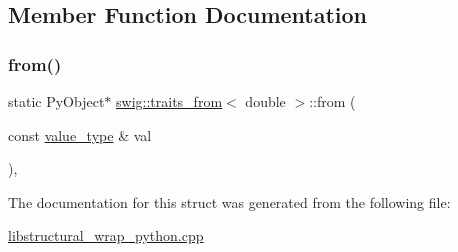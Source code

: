 \subsection{Member Function Documentation}
\mbox{\label{structswig_1_1traits__from_3_01double_01_4_ae561b4392eb983662f203737585c2241}} 
\subsubsection{\texorpdfstring{from()}{from()}}
{\footnotesize\ttfamily static Py\+Object$\ast$ \hyperlink{structswig_1_1traits__from}{swig\+::traits\+\_\+from}$<$ double $>$\+::from (\begin{DoxyParamCaption}\item[{const \hyperlink{structswig_1_1traits__from_3_01double_01_4_a91858e8bb1587ef10fc2c5e277abcc33}{value\+\_\+type} \&}]{val }\end{DoxyParamCaption})\hspace{0.3cm}{\ttfamily [inline]}, {\ttfamily [static]}}



The documentation for this struct was generated from the following file\+:\begin{DoxyCompactItemize}
\item 
\hyperlink{libstructural__wrap__python_8cpp}{libstructural\+\_\+wrap\+\_\+python.\+cpp}\end{DoxyCompactItemize}
